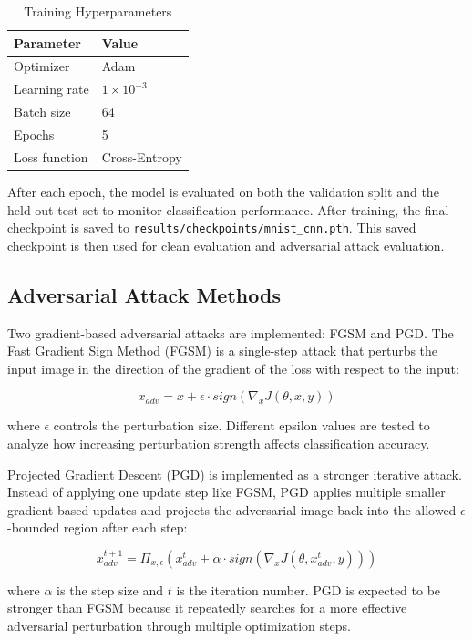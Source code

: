 \documentclass[conference,10pt]{IEEEtran}
\begin{document}
\begin{table}[H]
\caption{Training Hyperparameters}
\label{tab:hyperparams}
\centering
\renewcommand{\arraystretch}{1.15}
\begin{tabular}{p{} p{}}
\hline
\textbf{Parameter} & \textbf{Value} \\
\hline
Optimizer & Adam \\
Learning rate & $1 \times 10^{-3}$ \\
Batch size & 64 \\
Epochs & 5 \\
Loss function & Cross-Entropy \\
\hline
\end{tabular}
\end{table}

After each epoch, the model is evaluated on both the validation split and the held-out test set to monitor classification performance. After training, the final checkpoint is saved to \texttt{results/checkpoints/mnist\_cnn.pth}. This saved checkpoint is then used for clean evaluation and adversarial attack evaluation.

\subsection{Adversarial Attack Methods}

Two gradient-based adversarial attacks are implemented: FGSM and PGD. The Fast Gradient Sign Method (FGSM) is a single-step attack that perturbs the input image in the direction of the gradient of the loss with respect to the input:

\[
x_{adv} = x + \epsilon \cdot sign(\nabla_x J(\theta, x, y))
\]

where $\epsilon$ controls the perturbation size. Different epsilon values are tested to analyze how increasing perturbation strength affects classification accuracy.

Projected Gradient Descent (PGD) is implemented as a stronger iterative attack. Instead of applying one update step like FGSM, PGD applies multiple smaller gradient-based updates and projects the adversarial image back into the allowed $\epsilon$-bounded region after each step:

\[
x^{t+1}_{adv} = \Pi_{x,\epsilon}
\left(
x^t_{adv} + \alpha \cdot sign(\nabla_x J(\theta, x^t_{adv}, y))
\right)
\]

where $\alpha$ is the step size and $t$ is the iteration number. PGD is expected to be stronger than FGSM because it repeatedly searches for a more effective adversarial perturbation through multiple optimization steps.
\end{document}
